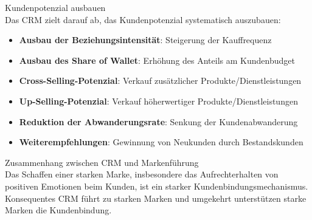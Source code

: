 \begin{concept}{Kundenpotenzial ausbauen}\\
Das CRM zielt darauf ab, das Kundenpotenzial systematisch auszubauen:
\begin{itemize}
    \item \textbf{Ausbau der Beziehungsintensität}: Steigerung der Kauffrequenz
    \item \textbf{Ausbau des Share of Wallet}: Erhöhung des Anteils am Kundenbudget
    \item \textbf{Cross-Selling-Potenzial}: Verkauf zusätzlicher Produkte/Dienstleistungen
    \item \textbf{Up-Selling-Potenzial}: Verkauf höherwertiger Produkte/Dienstleistungen
    \item \textbf{Reduktion der Abwanderungsrate}: Senkung der Kundenabwanderung
    \item \textbf{Weiterempfehlungen}: Gewinnung von Neukunden durch Bestandskunden
\end{itemize}
\end{concept}

\begin{concept}{Zusammenhang zwischen CRM und Markenführung}\\
Das Schaffen einer starken Marke, insbesondere das Aufrechterhalten von positiven Emotionen beim Kunden, ist ein starker Kundenbindungsmechanismus. Konsequentes CRM führt zu starken Marken und umgekehrt unterstützen starke Marken die Kundenbindung.
\end{concept}

